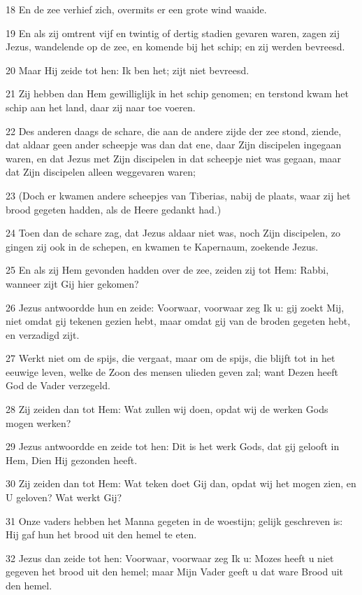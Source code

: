 \par 18 En de zee verhief zich, overmits er een grote wind waaide.
\par 19 En als zij omtrent vijf en twintig of dertig stadien gevaren waren, zagen zij Jezus, wandelende op de zee, en komende bij het schip; en zij werden bevreesd.
\par 20 Maar Hij zeide tot hen: Ik ben het; zijt niet bevreesd.
\par 21 Zij hebben dan Hem gewilliglijk in het schip genomen; en terstond kwam het schip aan het land, daar zij naar toe voeren.
\par 22 Des anderen daags de schare, die aan de andere zijde der zee stond, ziende, dat aldaar geen ander scheepje was dan dat ene, daar Zijn discipelen ingegaan waren, en dat Jezus met Zijn discipelen in dat scheepje niet was gegaan, maar dat Zijn discipelen alleen weggevaren waren;
\par 23 (Doch er kwamen andere scheepjes van Tiberias, nabij de plaats, waar zij het brood gegeten hadden, als de Heere gedankt had.)
\par 24 Toen dan de schare zag, dat Jezus aldaar niet was, noch Zijn discipelen, zo gingen zij ook in de schepen, en kwamen te Kapernaum, zoekende Jezus.
\par 25 En als zij Hem gevonden hadden over de zee, zeiden zij tot Hem: Rabbi, wanneer zijt Gij hier gekomen?
\par 26 Jezus antwoordde hun en zeide: Voorwaar, voorwaar zeg Ik u: gij zoekt Mij, niet omdat gij tekenen gezien hebt, maar omdat gij van de broden gegeten hebt, en verzadigd zijt.
\par 27 Werkt niet om de spijs, die vergaat, maar om de spijs, die blijft tot in het eeuwige leven, welke de Zoon des mensen ulieden geven zal; want Dezen heeft God de Vader verzegeld.
\par 28 Zij zeiden dan tot Hem: Wat zullen wij doen, opdat wij de werken Gods mogen werken?
\par 29 Jezus antwoordde en zeide tot hen: Dit is het werk Gods, dat gij gelooft in Hem, Dien Hij gezonden heeft.
\par 30 Zij zeiden dan tot Hem: Wat teken doet Gij dan, opdat wij het mogen zien, en U geloven? Wat werkt Gij?
\par 31 Onze vaders hebben het Manna gegeten in de woestijn; gelijk geschreven is: Hij gaf hun het brood uit den hemel te eten.
\par 32 Jezus dan zeide tot hen: Voorwaar, voorwaar zeg Ik u: Mozes heeft u niet gegeven het brood uit den hemel; maar Mijn Vader geeft u dat ware Brood uit den hemel.
